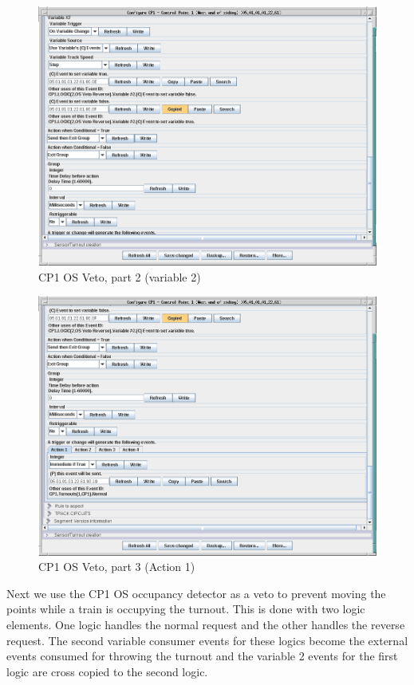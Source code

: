 \begin{figure}[hbpt]\begin{centering}%
\includegraphics[width=5in]{CP1-OSVeto-Normal2.png}
\caption{CP1 OS Veto, part 2 (variable 2)}
\label{fig:CP1-OSVeto-Normal2}
\end{centering}\end{figure}                                                    
\begin{figure}[hbpt]\begin{centering}%
\includegraphics[width=5in]{CP1-OSVeto-Normal3.png}
\caption{CP1 OS Veto, part 3 (Action 1)}
\label{fig:CP1-OSVeto-Normal3}
\end{centering}\end{figure}                                                    
Next we use the CP1 OS occupancy detector as a veto to prevent moving the 
points while a train is occupying the turnout.  This is done with two logic 
elements.  One logic handles the normal request and the other handles the 
reverse request.  The second variable consumer events for these logics become 
the external events consumed for throwing the turnout and the variable 2 
events for the first logic are cross copied to the second logic.

